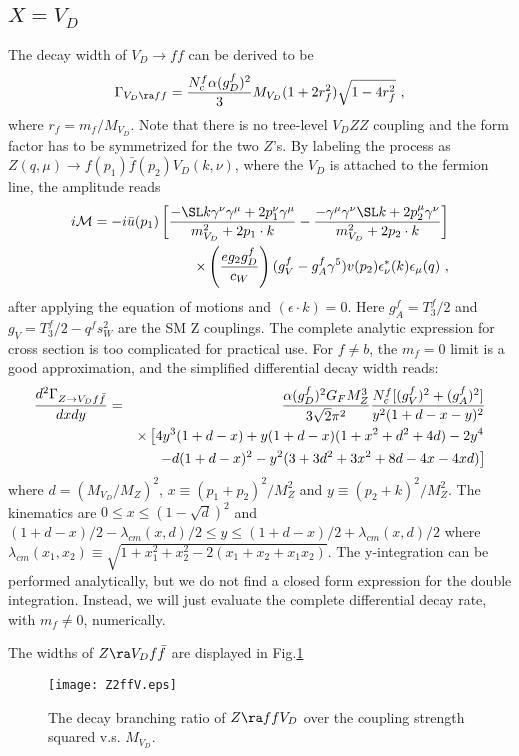 \documentclass[11pt]{article}
\begin{document}
\subsection{$X=V_D$}
The decay width of $V_D\to ff$ can be derived to be
\begin{equation}
\Gamma _{V_D\ra ff}={N_c^f \alpha (g^f_D)^2\over 3}M_{V_D} (1+2 r_f^2)\sqrt{1-4 r_f^2}\ ,
\end{equation}
where $r_f= m_f/M_{V_D}$. Note that there is no tree-level $V_D Z Z$ coupling and the form factor has to be symmetrized for the two $Z$'s.
 By labeling the process as $Z(q,\mu)\to f(p_1) \bar{f}(p_2) V_D(k,\nu)$, where the $V_D$ is attached to the fermion line, the amplitude reads
 \begin{eqnarray}
i{\cal M}=-i \bar{u}(p_1)\left[{ -\SL k\gamma^\nu \gamma^\mu +2p_1^\nu \gamma^\mu \over m_{V_D}^2 +2 p_1\cdot k}-{ -\gamma^\mu \gamma^\nu\SL k +2p_2^\mu \gamma^\nu \over m_{V_D}^2 +2 p_2\cdot k}\right]\nonumber \\
 \times \left(\frac{e g_2 g_D^f}{c_W}\right)(g^f_V-g^f_A \gamma^5 ) v(p_2)\epsilon_\nu^*(k) \epsilon_\mu(q)\ ,
 \end{eqnarray}
after applying the equation of motions and $(\epsilon\cdot k)=0$.
Here $g^f_A=T^f_3/2$ and $g_V=T^f_3/2-q^f s_W^2$ are the SM Z couplings.
The complete analytic expression for cross section is too complicated for practical use.
For $f\neq b$, the $m_f=0$ limit is a good approximation, and the simplified differential decay width reads:
\begin{eqnarray}
\frac{d^2 \Gamma _{Z \to V_D  f\bar{f}}}{dx dy} &=& {\alpha (g_D^f)^2 G_F M_Z^3\over 3\sqrt{2} \pi^2}{N_c^f [(g^f_V)^2+(g^f_A)^2 ]\over y^2(1+d-x-y)^2}\nonumber \\
&& \times\left[ 4y^3(1+d-x) +y(1+d-x)(1+x^2+d^2+4d)-2y^4\right.\nonumber \\
&& \left.-d(1+d-x)^2-y^2(3+3d^2+3x^2+8d-4x-4xd) \right]
\end{eqnarray}
where $d=(M_{V_D}/M_Z)^2$, $x\equiv (p_1+p_2)^2/M_Z^2$ and $y\equiv (p_2+k)^2/M_Z^2$.
The kinematics are $ 0\leq x\leq (1-\sqrt{d})^2$ and  $ (1+d-x)/2 -\lambda_{cm}(x,d)/2\leq  y\leq (1+d-x)/2 +\lambda_{cm}(x,d)/2$ where
 $\lambda_{cm}(x_1,x_2)\equiv \sqrt{1+x_1^2+x_2^2-2(x_1+x_2+x_1 x_2 )}$.
The y-integration can be performed analytically, but we do not find a closed form expression for the double integration.
Instead,  we will just evaluate the complete differential decay rate, with $m_f\neq 0$, numerically.

The widths of $Z\ra V_D f\bar{f}$ are displayed in  Fig.\ref{fig:Z_VDff}
\begin{figure}
    \centering
    \texttt{[image: Z2ffV.eps]}
    \caption{The decay branching ratio of $Z\ra ff V_D$ over the coupling strength squared  v.s. $M_{V_D}$. }
   \label{fig:Z_VDff}
\end{figure}
\end{document}
